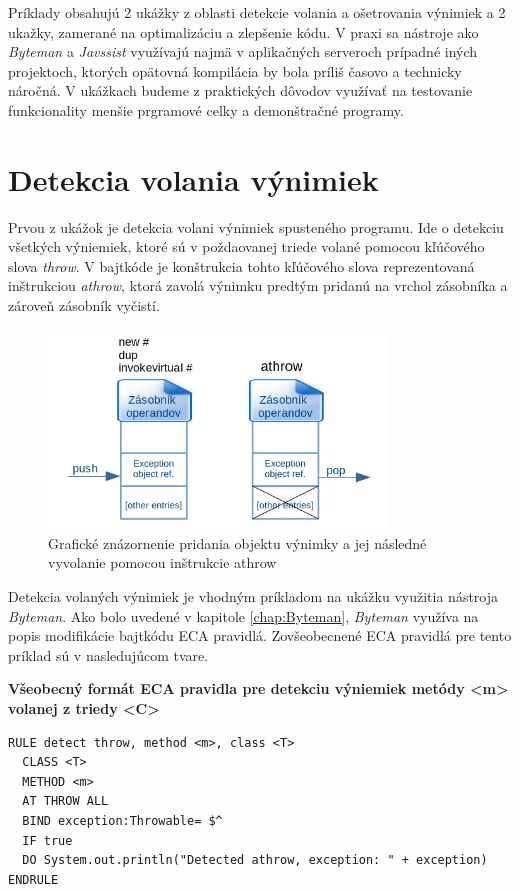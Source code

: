 \documentclass[11pt,final,oneside]{fithesis}
\newenvironment{example}[1]
{
\vspace{3mm}
\noindent\textbf{#1}
\vspace{2mm}
}
{
\vspace{3mm}
}
\begin{document}
Príklady obsahujú 2 ukážky z oblasti detekcie volania a ošetrovania výnimiek a 2 ukažky, zamerané na optimalizáciu a zlepšenie kódu. V praxi sa nástroje ako
\textit{Byteman} a \textit{Javssist} využívajú najmä v aplikačných serveroch  prípadné iných projektoch, ktorých opätovná kompilácia by bola príliš časovo a technicky náročná. V ukážkach budeme z praktických dôvodov využívať na testovanie funkcionality menšie prgramové celky a demonštračné programy.

\section{Detekcia volania výnimiek}
Prvou z ukážok je detekcia volani výnimiek spusteného programu. Ide o detekciu všetkých výniemiek, ktoré sú v poždaovanej triede volané pomocou kľúčového slova \textit{throw}. V bajtkóde je konštrukcia tohto kľúčového slova reprezentovaná inštrukciou \textit{athrow}, ktorá zavolá výnimku predtým pridanú na vrchol zásobníka a zároveň zásobník vyčistí.

\begin{figure}[H]
  \centering
   \includegraphics[width=0.80\textwidth]{throw.png}
  \caption{Grafické znázornenie pridania objektu výnimky a jej následné vyvolanie pomocou inštrukcie athrow}
  \label{fig:throw}
\end{figure}

Detekcia volaných výnimiek je vhodným príkladom na ukážku využitia nástroja \textit{Byteman}. Ako bolo uvedené v kapitole \ref{chap:Byteman}, \textit{Byteman} využíva na popis modifikácie bajtkódu ECA pravidlá. Zovšeobecnené ECA pravidlá pre tento príklad sú v nasledujúcom tvare.

\begin{example}{Všeobecný formát ECA pravidla pre detekciu výniemiek metódy <m> volanej z triedy <C>}
\begin{verbatim}
RULE detect throw, method <m>, class <T>
  CLASS <T>
  METHOD <m>
  AT THROW ALL
  BIND exception:Throwable= $^
  IF true
  DO System.out.println("Detected athrow, exception: " + exception)
ENDRULE
\end{verbatim}
\end{example}
\end{document}
